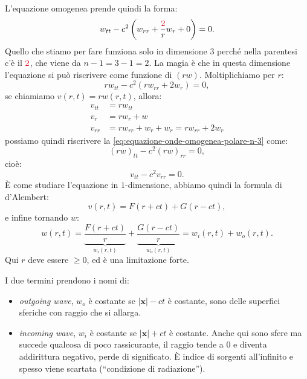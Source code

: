 \documentclass[10pt,a4paper,twoside,openright]{book}
\begin{document}
L'equazione omogenea prende quindi la forma:
\begin{equation}
	w_{tt} -c^{2}\left( w_{rr} +\frac{\textcolor[rgb]{0.82,0.01,0.11}{2}}{r} w_{r} +0\right) =0.
	\label{eq:equazione-onde-omogenea-polare-n-3}
\end{equation}
Quello che stiamo per fare funziona solo in dimensione $3$ perché nella parentesi c'è il $\textcolor[rgb]{0.82,0.01,0.11}{2}$, che viene da $n-1=3-1=2$. La magia è che in questa dimensione l'equazione si può riscrivere come funzione di $( rw)$. Moltiplichiamo per $r$:
\begin{equation*}
	rw_{tt} -c^{2}( rw_{rr} +2w_{r}) =0,
\end{equation*}
se chiamiamo $v( r,t) =rw( r,t)$, allora:
\begin{align*}
	v_{tt} & =rw_{tt}                                \\
	v_{r}  & =rw_{r} +w                              \\
	v_{rr} & =rw_{rr} +w_{r} +w_{r} =rw_{rr} +2w_{r} 
\end{align*}
possiamo quindi riscrivere la \eqref{eq:equazione-onde-omogenea-polare-n-3} come:
\begin{equation}
	( rw)_{tt} -c^{2}( rw)_{rr} =0,
\end{equation}
cioè:
\begin{equation}
	v_{tt} -c^{2} v_{rr} =0.
\end{equation}
È come studiare l'equazione in $1$-dimensione, abbiamo quindi la formula di d'Alembert:
\begin{equation}
	v( r,t) =F( r+ct) +G( r-ct) ,
\end{equation}
e infine tornando $w$:
\begin{equation}
	\boxed{w( r,t) =\underbrace{\frac{F( r+ct)}{r}}_{w_{i}( r,t)} +\underbrace{\frac{G( r-ct)}{r}}_{w_{o}( r,t)} =w_{i}( r,t) +w_{o}( r,t)} .
\end{equation}
Qui $r$ deve essere $\geqslant 0$, ed è una limitazione forte.

I due termini prendono i nomi di:
\begin{itemize}
	\item \textit{outgoing wave}, $w_{o}$ è costante se $| \mathbf{x}| -ct$ è costante, sono delle superfici sferiche con raggio che si allarga.
	\item \textit{incoming wave}, $w_{i}$ è costante se $| \mathbf{x}| +ct$ è costante. Anche qui sono sfere ma succede qualcosa di poco rassicurante, il raggio tende a $0$ e diventa addirittura negativo, perde di significato. È indice di sorgenti all'infinito e spesso viene scartata (``condizione di radiazione'').
\end{itemize}
\end{document}
